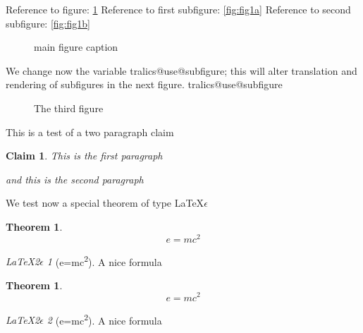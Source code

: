 \documentclass{amsart}
\numberwithin{equation}{section}
\theoremstyle{plain}
\newtheorem{theo}[subsection]{Theorem}%
\newtheorem{claim}[subsection]{Claim}%
\theoremstyle{remark}
\begin{document}
Reference to figure: \ref{fig:fig1}
Reference to first subfigure: \ref{fig:fig1a}
Reference to second subfigure: \ref{fig:fig1b}
\begin{figure}[htbp]
    \centering
    \hspace{2cm}
    \par
    \caption{main figure caption}
    \label{fig:fig1}
\end{figure}

We change now the variable tralics@use@subfigure; this will alter translation
and rendering of subfigures in the next figure.
\csname tralics@use@subfigure
\begin{figure}
\caption{The third figure}
\subfigure{\logo\label{Fa}}\subfigure{\logo\label{Fb}}\subfigure[abc]{\logo\label{Fc}}\label{td}
\end{figure}

This is a test of a two paragraph claim
\begin{claim} This is the first paragraph
\par and this is the second paragraph
\end{claim}



We test now a special theorem of type \LaTeX$\epsilon$
\begin{theo}\begin{equation}e=mc^2 \end{equation}\end{theo}
\newtheorem{nn}{\LaTeX2$\epsilon$}[section]
\begin{nn}[e=mc\textsuperscript{2}]A nice formula\end{nn}


\begin{theo}\begin{equation}e=mc^2 \end{equation}\end{theo}
\begin{nn}[e=mc\textsuperscript{2}]A nice formula\end{nn}




\end{document}
